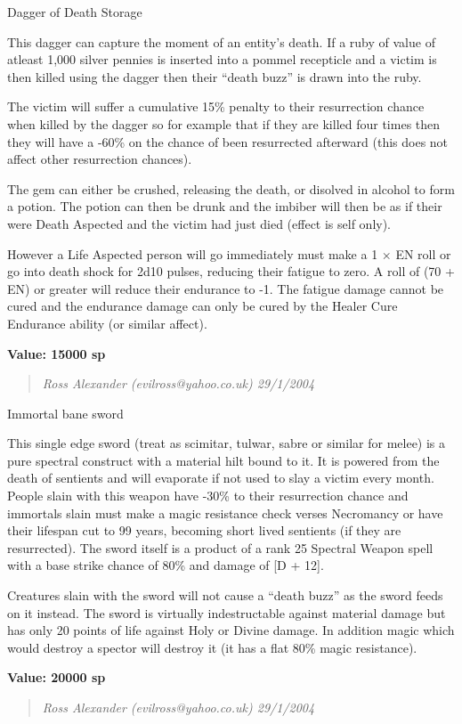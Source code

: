 \documentclass[a4paper]{article}
\begin{document}


\begin{ep-box}{Dagger of Death Storage}

This dagger can capture the moment of an entity's death.  If
a ruby of value of atleast 1,000 silver pennies is inserted
into a pommel recepticle and a victim is then killed using
the dagger then their ``death buzz'' is drawn into the ruby.

The victim will suffer a cumulative 15\% penalty to their resurrection
chance when killed by the dagger so for example that if they are
killed four times then they will have a -60\% on the chance of been
resurrected afterward (this does not affect other resurrection
chances).

The gem can either be crushed, releasing the death, or disolved in
alcohol to form a potion.  The potion can then be drunk and the
imbiber will then be as if their were Death Aspected and the victim
had just died (effect is self only).

However a Life Aspected person will go immediately must make a 1
$\times$ EN roll or go into death shock for 2d10 pulses, reducing
their fatigue to zero.  A roll of (70 + EN) or greater will reduce
their endurance to -1.  The fatigue damage cannot be cured and the
endurance damage can only be cured by the Healer Cure Endurance
ability (or similar affect).

\textbf{Value: 15000 sp}
\begin{quote}
\emph{Ross Alexander (evilross@yahoo.co.uk) 29/1/2004}
\end{quote}
\end{ep-box}



\begin{ep-box}{Immortal bane sword}

This single edge sword (treat as scimitar, tulwar, sabre or similar
for melee) is a pure spectral construct with a material hilt bound to
it.  It is powered from the death of sentients and will evaporate if
not used to slay a victim every month.  People slain with this weapon
have -30\% to their resurrection chance and immortals slain must make
a magic resistance check verses Necromancy or have their lifespan cut
to 99 years, becoming short lived sentients (if they are resurrected).
The sword itself is a product of a rank 25 Spectral Weapon spell with
a base strike chance of 80\% and damage of [D + 12].

Creatures slain with the sword will not cause a ``death buzz'' as the
sword feeds on it instead.  The sword is virtually indestructable
against material damage but has only 20 points of life against Holy or
Divine damage.  In addition magic which would destroy a spector will
destroy it (it has a flat 80\% magic resistance).

\textbf{Value: 20000 sp}
\begin{quote}
\emph{Ross Alexander (evilross@yahoo.co.uk) 29/1/2004}
\end{quote}
\end{ep-box}
\end{document}
